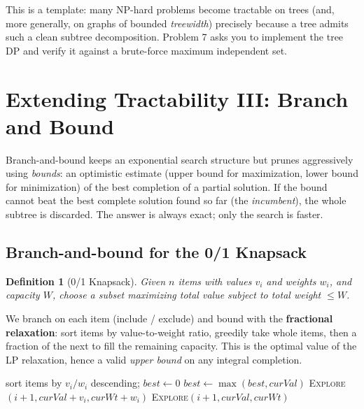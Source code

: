 \documentclass[11pt]{article}
\newtheorem{definition}[theorem]{Definition}
\begin{document}
This is a template: many NP-hard problems become tractable on trees (and, more
generally, on graphs of bounded \emph{treewidth}) precisely because a tree
admits such a clean subtree decomposition. Problem 7 asks you to implement the
tree DP and verify it against a brute-force maximum independent set.

\section{Extending Tractability III: Branch and Bound}

Branch-and-bound keeps an exponential search structure but prunes aggressively
using \emph{bounds}: an optimistic estimate (upper bound for maximization,
lower bound for minimization) of the best completion of a partial solution. If
the bound cannot beat the best complete solution found so far (the
\emph{incumbent}), the whole subtree is discarded. The answer is always exact;
only the search is faster.

\subsection{Branch-and-bound for the 0/1 Knapsack}

\begin{definition}[0/1 Knapsack]
Given $n$ items with values $v_i$ and weights $w_i$, and capacity $W$, choose a
subset maximizing total value subject to total weight $\le W$.
\end{definition}

We branch on each item (include / exclude) and bound with the
\textbf{fractional relaxation}: sort items by value-to-weight ratio, greedily
take whole items, then a fraction of the next to fill the remaining capacity.
This is the optimal value of the LP relaxation, hence a valid \emph{upper
bound} on any integral completion.

\begin{algorithm}[h]
\caption{Branch-and-Bound 0/1 Knapsack}
\begin{algorithmic}[1]
\State sort items by $v_i / w_i$ descending; $best \gets 0$
    \State $best \gets \max(best, curVal)$
     \Return \EndIf
     \Return {} \EndIf
     \textsc{Explore}$(i{+}1, curVal+v_i, curWt+w_i)$ \EndIf
    \State \textsc{Explore}$(i{+}1, curVal, curWt)$
\EndFunction
\end{algorithmic}
\end{algorithm}
\end{document}
